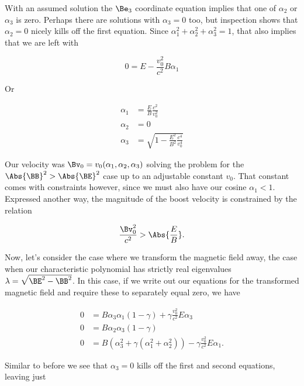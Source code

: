 With an assumed solution the $\Be_3$ coordinate equation implies that one of $\alpha_2$ or $\alpha_3$ is zero.  Perhaps there are solutions with $\alpha_3 = 0$ too, but inspection shows that $\alpha_2 = 0$ nicely kills off the first equation.  Since $\alpha_1^2 + \alpha_2^2 + \alpha_3^2 = 1$, that also implies that we are left with

\begin{equation}\label{eqn:relElectroDynProblemSet3:1680}
0 = E - \frac{v_0^2}{c^2} B \alpha_1 
\end{equation}

Or

\begin{align}\label{eqn:relElectroDynProblemSet3:1700}
\alpha_1 &= \frac{E}{B} \frac{c^2}{v_0^2} \\
\alpha_2 &= 0 \\
\alpha_3 &= \sqrt{
1 - \frac{E^2}{B^2} \frac{c^4}{v_0^4} 
}
\end{align}

Our velocity was $\Bv_0 = v_0 (\alpha_1, \alpha_2, \alpha_3)$ solving the problem for the $\Abs{\BB}^2 > \Abs{\BE}^2$ case up to an adjustable constant $v_0$.  That constant comes with constraints however, since we must also have our cosine $\alpha_1 < 1$.  Expressed another way, the magnitude of the boost velocity is constrained by the relation

\begin{equation}\label{eqn:relElectroDynProblemSet3:1720}
\frac{\Bv_0^2}{c^2} > \Abs{\frac{E}{B}}.
\end{equation}

Now, let's consider the case where we transform the magnetic field away, the case when our characteristic polynomial has strictly real eigenvalues $\lambda = \sqrt{\BE^2 - \BB^2}$.  In this case, if we write out our equations for the transformed magnetic field and require these to separately equal zero, we have

\begin{align}\label{eqn:relElectroDynProblemSet3:1740}
0 &= B \alpha_3 \alpha_1 ( 1 - \gamma ) + \gamma \frac{v_0^2}{c^2} E \alpha_3 \\
0 &= B \alpha_2 \alpha_3 ( 1 - \gamma ) \\
0 &= B (\alpha_3^2 + \gamma (\alpha_1^2 + \alpha_2^2)) - \gamma \frac{v_0^2}{c^2} E \alpha_1.
\end{align}

Similar to before we see that $\alpha_3 = 0$ kills off the first and second equations, leaving just

